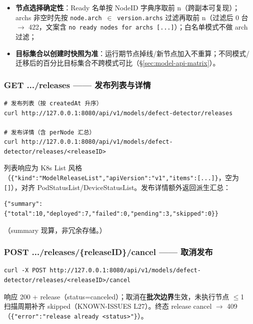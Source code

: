 \begin{itemize}
  \item \textbf{节点选择确定性}：Ready 名单按 NodeID 字典序取前 n（跨副本可复现）；archs 非空时先按 \texttt{node.arch $\in$ version.archs} 过滤再取前 n（过滤后 0 台 $\rightarrow$ 422，文案含 \texttt{no ready nodes for archs [...]}）；白名单模式不做 arch 过滤；
  \item \textbf{目标集合以创建时快照为准}：运行期节点掉线/新节点加入不重算；不同模式/迁移后的百分比目标集合不跨模式可比（\S\ref{sec:model-api-matrix}）。
\end{itemize}

\subsubsection{GET .../releases —— 发布列表与详情}

\begin{lstlisting}
# 发布列表（按 createdAt 升序）
curl http://127.0.0.1:8080/api/v1/models/defect-detector/releases

# 发布详情（含 perNode 汇总）
curl http://127.0.0.1:8080/api/v1/models/defect-detector/releases/<releaseID>
\end{lstlisting}

列表响应为 K8s List 风格（\texttt{\{"kind":"ModelReleaseList","apiVersion":"v1","items":[...]\}}，空为 \texttt{[]}），对齐 PodStatusList/DeviceStatusList。发布详情额外返回派生汇总：

\begin{lstlisting}
{"summary":{"total":10,"deployed":7,"failed":0,"pending":3,"skipped":0}}
\end{lstlisting}

（summary 现算，非冗余存储。）

\subsubsection{POST .../releases/\{releaseID\}/cancel —— 取消发布}

\begin{lstlisting}
curl -X POST http://127.0.0.1:8080/api/v1/models/defect-detector/releases/<releaseID>/cancel
\end{lstlisting}

响应 200 + release（status=canceled）；取消在\textbf{批次边界}生效，未执行节点 $\leq$1 扫描周期补齐 skipped（KNOWN-ISSUES L27）。终态 release cancel $\rightarrow$ 409（\texttt{\{"error":"release already <status>"\}}）。

